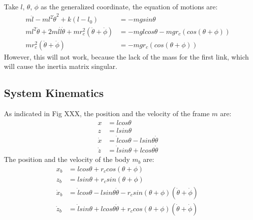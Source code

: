 \noindent
Take $l$, $\theta$, $\phi$ as the generalized coordinate, the equation of motions are:
\begin{align*}
m\ddot{l} - ml^2\dot{\theta}^2 + k(l-l_0) &= -mgsin\theta\\
ml^2\ddot{\theta} + 2ml\dot l \dot{\theta} + mr_c^2(\ddot\theta+\ddot\phi) &= -mglcos\theta - mgr_c(cos(\theta + \phi))\\
mr_c^2(\ddot\theta+\ddot\phi) &= - mgr_c(cos(\theta + \phi))
\end{align*}
\noindent
However, this will not work, because the lack of the mass for the first link, which will cause the inertia matrix singular.
\pagebreak

\subsection{System Kinematics}
As indicated in Fig XXX, the position 
and the velocity of the frame $m$ are:
\begin{align*}
x &= lcos\theta \\
z &= lsin\theta \\
\dot x &= \dot lcos\theta -lsin\theta\dot \theta \\
\dot z &= \dot lsin\theta + lcos\theta \dot{\theta}
\end{align*}
The position 
and the velocity of the body $m_b$ are:
\begin{align*}
x_b &= lcos\theta + r_ccos(\theta +\phi)\\
z_b &= lsin\theta + r_csin(\theta +\phi)\\
\dot x_b &= \dot lcos\theta -lsin\theta\dot \theta -  r_csin(\theta +\phi)(\dot\theta +\dot\phi)\\
\dot z_b &= \dot lsin\theta + lcos\theta \dot{\theta}+ r_ccos(\theta +\phi)(\dot\theta +\dot\phi)\
\end{align*}





